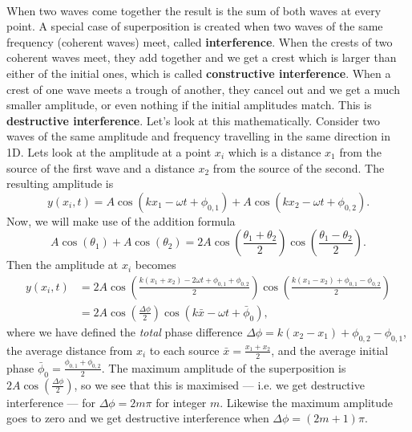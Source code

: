 \documentclass[../classical_mechanics.tex]{subfiles}
\begin{document}
        \paragraph{}
        When two waves come together the result is the sum of both waves at every point.
        A special case of superposition is created when two waves of the same frequency (coherent waves) meet, called \textbf{interference}.
        When the crests of two coherent waves meet, they add together and we get a crest which is larger than either of the initial ones, which is called \textbf{constructive interference}.
        When a crest of one wave meets a trough of another, they cancel out and we get a much smaller amplitude, or even nothing if the initial amplitudes match.
        This is \textbf{destructive interference}.
        Let's look at this mathematically.
        Consider two waves of the same amplitude and frequency travelling in the same direction in 1D.
        Lets look at the amplitude at a point $x_i$ which is a distance $x_1$ from the source of the first wave and a distance $x_2$ from the source of the second.
        The resulting amplitude is
        \begin{equation}
            y(x_i,t)=A\cos(kx_1-\omega t+\phi_{0,1})+A\cos(kx_2-\omega t+\phi_{0,2}).
        \end{equation}
        Now, we will make use of the addition formula
        \begin{equation}
            A\cos(\theta_1)+A\cos(\theta_2)=2A\cos\left(\frac{\theta_1+\theta_2}{2}\right)\cos\left(\frac{\theta_1-\theta_2}{2}\right).
        \end{equation}
        Then the amplitude at $x_i$ becomes
        \begin{align}
            y(x_i,t)&=2A\cos\left(\frac{k(x_1+x_2)-2\omega t+\phi_{0,1}+\phi_{0,2}}{2}\right)\cos\left(\frac{k(x_1-x_2)+\phi_{0,1}-\phi_{0,2}}{2}\right)\\
            &=2A\cos\left(\frac{\Delta\phi}{2}\right)\cos(k\bar{x}-\omega t+\bar{\phi}_0),
        \end{align}
        where we have defined the \textit{total} phase difference $\Delta\phi=k(x_2-x_1)+\phi_{0,2}-\phi_{0,1}$, the average distance from $x_i$ to each source $\bar{x}=\frac{x_1+x_2}{2}$, and the average initial phase $\bar{\phi}_0=\frac{\phi_{0,1}+\phi_{0,2}}{2}$.
        The maximum amplitude of the superposition is $2A\cos\left(\frac{\Delta\phi}{2}\right)$, so we see that this is maximised --- i.e. we get destructive interference --- for $\Delta\phi=2m\pi$ for integer $m$.
        Likewise the maximum amplitude goes to zero and we get destructive interference when $\Delta\phi=(2m+1)\pi$.
\end{document}
